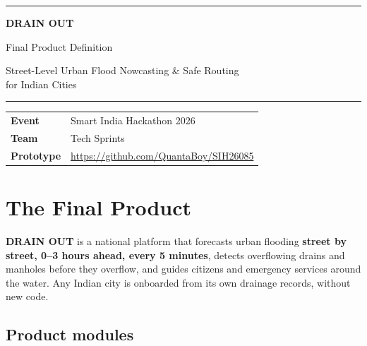 \documentclass[11pt,a4paper]{article}
\begin{document}
\begin{titlepage}
  \centering
  \vspace*{3cm}
  {\color{accent}\rule{\linewidth}{1.2pt}}\par\vspace{0.6cm}
  {\Huge\bfseries DRAIN OUT\par}
  \vspace{0.3cm}
  {\LARGE Final Product Definition\par}
  \vspace{0.4cm}
  {\large Street-Level Urban Flood Nowcasting \& Safe Routing\\ for Indian Cities\par}
  \vspace{0.6cm}
  {\color{accent}\rule{\linewidth}{1.2pt}}\par
  \vspace{1.5cm}
  \begin{tabular}{@{}ll@{}}
    \textbf{Event}     & Smart India Hackathon 2026 \\
    \textbf{Team}      & Tech Sprints \\
    \textbf{Prototype} & \url{https://github.com/QuantaBoy/SIH26085} \\
  \end{tabular}
  \vfill
\end{titlepage}

\tableofcontents
\newpage

\section{The Final Product}

\begin{keyline}
\textbf{DRAIN OUT} is a national platform that forecasts urban flooding
\textbf{street by street, 0--3 hours ahead, every 5 minutes}, detects overflowing
drains and manholes before they overflow, and guides citizens and emergency services
around the water. Any Indian city is onboarded from its own drainage records, without
new code.
\end{keyline}

\subsection{Product modules}
\end{document}

